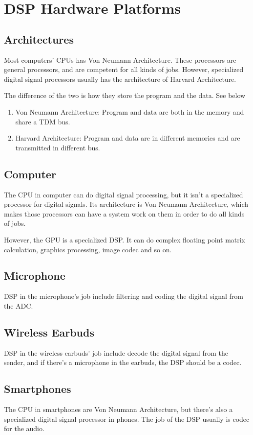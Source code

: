 \documentclass{article}
\begin{document}
\section{DSP Hardware Platforms}
\subsection{Architectures}
Most computers' CPUs has Von Neumann Architecture. These processors are general processors, and are competent for all kinds of jobs. However, specialized digital signal processors usually has the architecture of Harvard Architecture.

The difference of the two is how they store the program and the data. See below
\begin{enumerate}
	\item Von Neumann Architecture: Program and data are both in the memory and share a TDM bus.
	\item Harvard Architecture: Program and data are in different memories and are transmitted in different bus.
\end{enumerate}

\subsection{Computer}
The CPU in computer can do digital signal processing, but it isn't a specialized processor for digital signals. Its architecture is Von Neumann Architecture, which makes those processors can have a system work on them in order to do all kinds of jobs.

However, the GPU is a specialized DSP. It can do complex floating point matrix calculation, graphics processing, image codec and so on.

\subsection{Microphone}
DSP in the microphone's job include filtering and coding the digital signal from the ADC.

\subsection{Wireless Earbuds}
DSP in the wireless earbuds' job include decode the digital signal from the sender, and if there's a microphone in the earbuds, the DSP should be a codec.

\subsection{Smartphones}
The CPU in smartphones are Von Neumann Architecture, but there's also a specialized digital signal processor in phones. The job of the DSP usually is codec for the audio.
\end{document}

